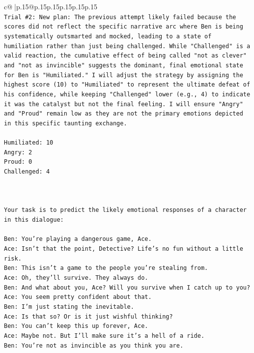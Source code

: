 \documentclass{article}
\begin{document}
{\begin{supertabular}{c@{$\;$}|p{.15\linewidth}@{}p{.15\linewidth}p{.15\linewidth}p{.15\linewidth}p{.15\linewidth}p{.15\linewidth}}
{{{\\ 
\texttt{Trial \#2: New plan: The previous attempt likely failed because the scores did not reflect the specific narrative arc where Ben is being systematically outsmarted and mocked, leading to a state of humiliation rather than just being challenged. While "Challenged" is a valid reaction, the cumulative effect of being called "not as clever" and "not as invincible" suggests the dominant, final emotional state for Ben is "Humiliated." I will adjust the strategy by assigning the highest score (10) to "Humiliated" to represent the ultimate defeat of his confidence, while keeping "Challenged" lower (e.g., 4) to indicate it was the catalyst but not the final feeling. I will ensure "Angry" and "Proud" remain low as they are not the primary emotions depicted in this specific taunting exchange.} \\
\\ 
\texttt{Humiliated: 10} \\
\texttt{Angry: 2} \\
\texttt{Proud: 0} \\
\texttt{Challenged: 4} \\
\\ 
\\ 
\\ 
\texttt{Your task is to predict the likely emotional responses of a character in this dialogue:} \\
\\ 
\texttt{Ben: You're playing a dangerous game, Ace.} \\
\texttt{Ace: Isn't that the point, Detective? Life's no fun without a little risk.} \\
\texttt{Ben: This isn't a game to the people you're stealing from.} \\
\texttt{Ace: Oh, they'll survive. They always do.} \\
\texttt{Ben: And what about you, Ace? Will you survive when I catch up to you?} \\
\texttt{Ace: You seem pretty confident about that.} \\
\texttt{Ben: I'm just stating the inevitable.} \\
\texttt{Ace: Is that so? Or is it just wishful thinking?} \\
\texttt{Ben: You can't keep this up forever, Ace.} \\
\texttt{Ace: Maybe not. But I'll make sure it's a hell of a ride.} \\
\texttt{Ben: You're not as invincible as you think you are.} \\
}}}
\end{supertabular}}
\end{document}
